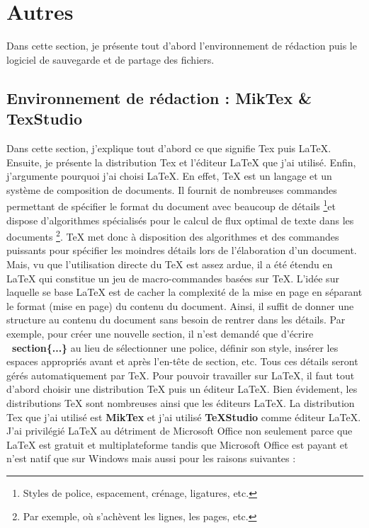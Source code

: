 \section{Autres}
Dans cette section, je présente tout d’abord l’environnement de rédaction puis le logiciel de sauvegarde et de partage des fichiers.
\subsection{Environnement de rédaction : MikTex \& TexStudio}
Dans cette section, j'explique tout d’abord ce que signifie Tex puis LaTeX. Ensuite, je présente la distribution Tex et l’éditeur LaTeX que j'ai utilisé. Enfin, j'argumente pourquoi j'ai choisi LaTeX. \newline
En effet, TeX est un langage et un système de composition de documents. Il fournit de nombreuses commandes permettant de spécifier le format du document avec beaucoup de détails \footnote{Styles de police, espacement, crénage, ligatures, etc.}et dispose d’algorithmes spécialisés pour le calcul de flux optimal de texte dans les documents \footnote{Par exemple, où s’achèvent les lignes, les pages, etc.}. TeX met donc à disposition des algorithmes et des commandes puissants pour spécifier les moindres détails lors de l’élaboration d’un document. Mais, vu que l’utilisation directe du TeX est assez ardue, il a été étendu en LaTeX qui constitue un jeu de macro-commandes basées sur TeX. \newline
L’idée sur laquelle se base LaTeX est de cacher la complexité de la mise en page en séparant le format (mise en page) du contenu du document. Ainsi, il suffit de donner une structure au contenu du document sans besoin de rentrer dans les détails. Par exemple, pour créer une nouvelle section, il n’est demandé que d’écrire \textbf{\ section\{...\}} au lieu de sélectionner une police, définir son style, insérer les espaces
appropriés avant et après l’en-tête de section, etc. Tous ces détails seront gérés automatiquement par TeX. \newline 
Pour pouvoir travailler sur LaTeX, il faut tout d’abord choisir une distribution TeX puis un éditeur LaTeX. Bien évidement, les distributions TeX sont nombreuses ainsi que les éditeurs LaTeX. La distribution Tex que j'ai utilisé est \textbf{MikTex} et j'ai utilisé \textbf{TeXStudio} comme éditeur LaTeX. \newline
J'ai privilégié LaTeX au détriment de Microsoft Office non seulement parce que LaTeX est gratuit et multiplateforme tandis que Microsoft Office est payant et n’est natif que sur Windows mais aussi pour les raisons suivantes :
